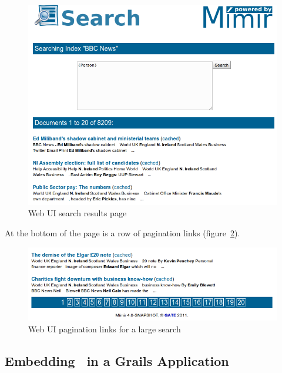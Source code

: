 \begin{figure}[tbp]
\begin{center}
\includegraphics[scale=0.5]{img/web-ui-results}
\caption{Web UI search results page}
\label{fig:gus:results}
\end{center}
\end{figure}

At the bottom of the page is a row of pagination links
(figure~\ref{fig:gus:pagination}).

\begin{figure}[tbp]
\begin{center}
\includegraphics[scale=0.5]{img/web-ui-pagination}
\caption{Web UI pagination links for a large search}
\label{fig:gus:pagination}
\end{center}
\end{figure}



\subsection{Embedding \Mimir\ in a Grails Application}
\label{sec:search:grails}

